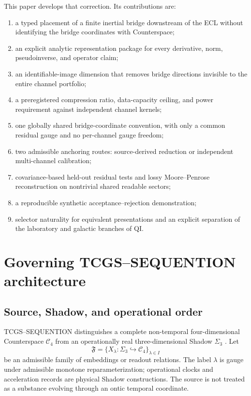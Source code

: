 \documentclass[11pt]{article}
\newcommand{\Cfour}{\mathcal{C}_{4}}
\newcommand{\Shadow}{\Sigma_{3}}
\begin{document}
This paper develops that correction. Its contributions are:
\begin{enumerate}[leftmargin=1.55em]
\item a typed placement of a finite inertial bridge downstream of the ECL without identifying the bridge coordinates with Counterspace;
\item an explicit analytic representation package for every derivative, norm, pseudoinverse, and operator claim;
\item an identifiable-image dimension that removes bridge directions invisible to the entire channel portfolio;
\item a preregistered compression ratio, data-capacity ceiling, and power requirement against independent channel kernels;
\item one globally shared bridge-coordinate convention, with only a common residual gauge and no per-channel gauge freedom;
\item two admissible anchoring routes: source-derived reduction or independent multi-channel calibration;
\item covariance-based held-out residual tests and lossy Moore--Penrose reconstruction on nontrivial shared readable sectors;
\item a reproducible synthetic acceptance--rejection demonstration;
\item selector naturality for equivalent presentations and an explicit separation of the laboratory and galactic branches of QI.
\end{enumerate}

\section{Governing TCGS--SEQUENTION architecture}

\subsection{Source, Shadow, and operational order}

TCGS--SEQUENTION distinguishes a complete non-temporal four-dimensional Counterspace \(\Cfour\) from an operationally real three-dimensional Shadow \(\Shadow\) \cite{ArellanoFoundation2026,ArellanoMinkowski2026}. Let
\begin{equation}
\mathfrak F
=\{X_{\lambda}:\Shadow\hookrightarrow\Cfour\}_{\lambda\in I}
\end{equation}
be an admissible family of embeddings or readout relations. The label \(\lambda\) is gauge under admissible monotone reparameterization; operational clocks and acceleration records are physical Shadow constructions. The source is not treated as a substance evolving through an ontic temporal coordinate.
\end{document}
